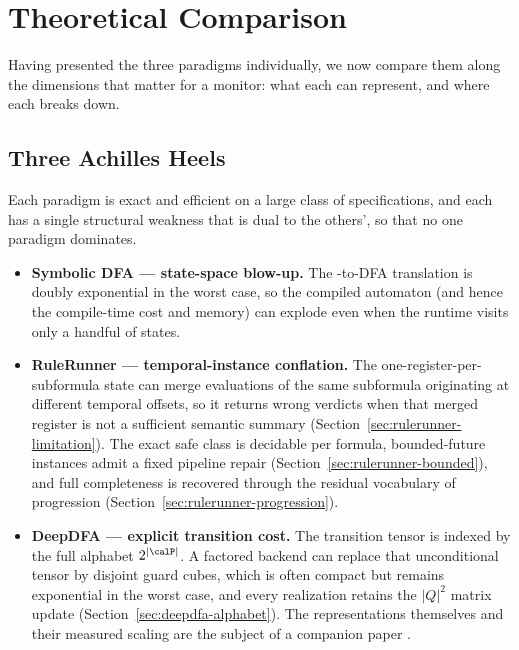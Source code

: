 \section{Theoretical Comparison}
\label{sec:theory-cmp}

Having presented the three paradigms individually, we now compare them along the dimensions that matter for a monitor: what each can represent, and where each breaks down.

\subsection{Three Achilles Heels}
\label{sec:theory-heels}

Each paradigm is exact and efficient on a large class of specifications, and each has a single structural weakness that is dual to the others', so that no one paradigm dominates.
%
\begin{itemize}
    \item \textbf{Symbolic DFA --- state-space blow-up.} The \ltlf-to-DFA translation is doubly exponential in the worst case, so the compiled automaton (and hence the compile-time cost and memory) can explode even when the runtime visits only a handful of states.
    \item \textbf{RuleRunner --- temporal-instance conflation.} The one-register-per-subformula state can merge evaluations of the same subformula originating at different temporal offsets, so it returns wrong verdicts when that merged register is not a sufficient semantic summary (Section~\ref{sec:rulerunner-limitation}).  The exact safe class is decidable per formula, bounded-future instances admit a fixed pipeline repair (Section~\ref{sec:rulerunner-bounded}), and full \ltlf completeness is recovered through the residual vocabulary of progression (Section~\ref{sec:rulerunner-progression}).
    \item \textbf{DeepDFA --- explicit transition cost.} The transition tensor is indexed by the full alphabet $2^{|\calP|}$. A factored backend can replace that unconditional tensor by disjoint guard cubes, which is often compact but remains exponential in the worst case, and every realization retains the $|Q|^2$ matrix update (Section~\ref{sec:deepdfa-alphabet}). The representations themselves and their measured scaling are the subject of a companion paper \paperB{}.
\end{itemize}
%
